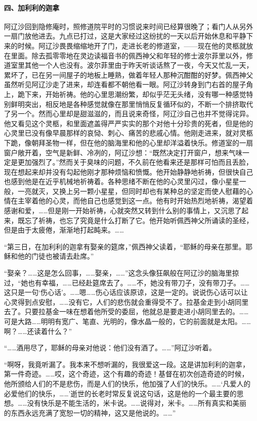 \paragraph*{四、加利利的迦拿}
\par 阿辽沙回到隐修庵时，照修道院平时的习惯说来时间已经算很晚了；看门人从另外一扇门放他进去。九点已打过，这是大家经过这纷扰的一天以后开始休息和平静下来的时候。阿辽沙畏畏缩缩地开了门，走进长老的修道室，——现在他的灵柩就放在里面。除去孤零零地在灵边读福音书的佩西神父和年轻的修士波尔菲里以外，修道室里其他一个人也没有。波尔菲里由于昨天听谈话熬了一夜，今天又忙乱一天，累坏了，已在另一间屋子的地板上睡熟，做着年轻人那种沉酣酣的好梦。佩西神父虽然听见阿辽沙走了进来，却连看都不朝他看一眼。阿辽沙转身到门右首的屋子角上，跪下来，开始祈祷。他的心里思潮纷繁，却似乎茫无头绪，没有哪一种感觉特别鲜明突出，相反地是各种感觉就像在那里悄悄反复循环似的，不断一个排挤取代了另一个。然而心里却是甜滋滋的，而且说来奇怪，阿辽沙自己也并不觉得诧异。他又看见这个灵柩，和里面遮盖得严严实实的那个对他十分珍贵的死者，但是他的心灵里已没有像早晨那样的哀恸、刺心、痛苦的悲戚心情。他刚走进来，就对灵柩下跪，像朝拜圣物一样，但在他的脑海里和他的心里却洋溢着快乐。修道室的一扇窗户敞开着，空气是新鲜、冷冽的，阿辽沙想：“既然决定打开窗户，想来气味一定是更加强烈了。”然而关于臭味的问题，不久前在他看来还是那样可怕而且丢脸，现在想起来却并没有勾起他刚才那种烦恼和愤慨。他开始静静地祈祷，但很快自己也感到他是在近乎机械地祈祷着。各种思绪不断在他的心灵里闪过，像小星星一般，一亮就灭，又换上另一颗小星星，但同时却也有某种总的坚定而使人慰藉的心情在主宰着他的心灵，而他自己也感觉到这一点。他有时开始热烈地祈祷，渴望着感谢和爱，……但是刚一开始祈祷，心就突然又转到什么别的事情上，又沉思了起来，既忘了祈祷，也忘了究竟是什么打断了它。他开始听佩西神父所诵读的圣经，但是由于太疲倦，渐渐地打起盹来。……
\par “第三日，在加利利的迦拿有娶亲的筵席，”佩西神父读着，“耶稣的母亲在那里。耶稣和他的门徒也被请去赴席。”
\par “娶亲？……这是怎么回事，……娶亲，……”这念头像狂飙般在阿辽沙的脑海里掠过，“她也有幸福，……已经赴筵席去了。……不，她没有带刀子，没有带刀子。……这只是一句‘伤心话’。……嗯……伤心话应该原谅，这是一定的。说说伤心话可以让心灵得到点安慰，……没有它，人们的悲伤就会重得受不了。拉基金走到小胡同里去了。只要拉基金一味在想着他所受的委屈，他就总是要走进小胡同里去的。……可是大路……明明有宽广、笔直、光明的，像水晶一般的，它的前面就是太阳。……啊？……还读着什么？”
\par “……酒用尽了，耶稣的母亲对他说：他们没有酒了。……”阿辽沙听着。
\par “啊呀，我竟听漏了。我本来不想听漏的，我很爱这一段。这是讲加利利的迦拿，第一件奇迹。……哎，这个奇迹，这个有趣的奇迹！基督在初次创造奇迹的时候，他所颁给人们的不是悲伤，而是人们的快乐，他加强了人们的快乐。……‘凡爱人的必爱他们的快乐，……’逝世的长老时常反复说这句话，这是他的一个最主要的思想。……没有快乐是不能生活的，米卡说。……说得对，米卡。……所有真实和美丽的东西永远充满了宽恕一切的精神，这又是他说的。……”
